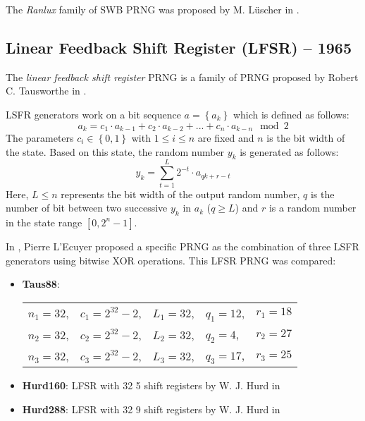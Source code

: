     The \textit{Ranlux} family of SWB PRNG was proposed by M. Lüscher in \cite{Luescher:1993}.

\subsection[Linear Feedback Shift Register (LFSR) -- 1965]{Linear Feedback Shift Register (LFSR) -- 1965} \label{subsec:lfsr}

    The \emph{linear feedback shift register} PRNG is a family of PRNG proposed by Robert C. Tausworthe in \cite{Tausworthe:1965}.

    LSFR generators work on a bit sequence $a = \left\{a_k\right\}$ which is defined as follows:
    \begin{equation*}
        a_k = c_1 \cdot a_{k - 1} + c_2 \cdot a_{k - 2} + ... + c_n \cdot a_{k - n} \mod 2
    \end{equation*}
    The parameters $c_i \in \left\{0, 1\right\}$ with $1 \leq i \leq n$ are fixed and $n$ is the bit width of the state.
    Based on this state, the random number $y_k$ is generated as follows:
    \begin{equation*}
        y_k = \sum_{t = 1}^{L} 2^{-t} \cdot a_{qk + r - t}
    \end{equation*}
    Here, $L \leq n$ represents the bit width of the output random number, $q$ is the number of bit between two successive $y_k$ in $a_k$ ($q \geq L$) and $r$ is a random number in the state range $\left[0, 2^n - 1\right]$.

    In \cite{LEcuyer:1996}, Pierre L'Ecuyer proposed a specific PRNG as the combination of three LSFR generators using bitwise XOR operations. This LFSR PRNG was compared:
    \begin{itemize}
        \itemsep0em
        \item \textbf{Taus88}:
            \begin{tabular}[t]{lllll}
                $n_1 = 32$, &$c_1 = 2^{32} - 2$, &$L_1 = 32$, &$q_1 = 12$, &$r_1 = 18$ \\
                $n_2 = 32$, &$c_2 = 2^{32} - 2$, &$L_2 = 32$, &$q_2 = 4$,  &$r_2 = 27$ \\
                $n_3 = 32$, &$c_3 = 2^{32} - 2$, &$L_3 = 32$, &$q_3 = 17$, &$r_3 = 25$
            \end{tabular}
        \item \textbf{Hurd160}: LFSR with 32 \SI{5}{\bit} shift registers by W. J. Hurd in \cite{Hurd:1974}
        \item \textbf{Hurd288}: LFSR with 32 \SI{9}{\bit} shift registers by W. J. Hurd in \cite{Hurd:1974}
    \end{itemize}

